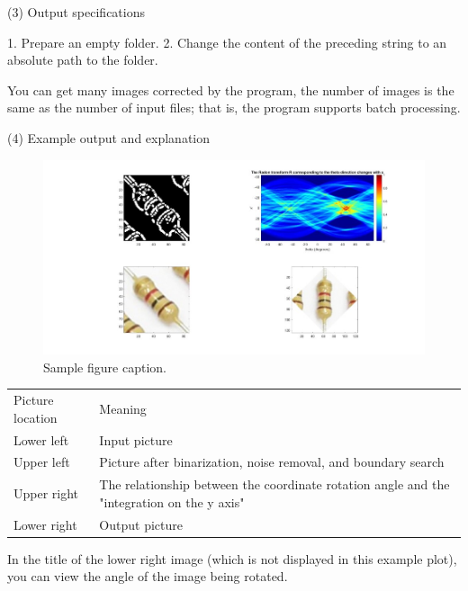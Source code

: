 \documentclass{article}
\begin{document}
(3) Output specifications


1. Prepare an empty folder.
2. Change the content of the preceding string to an absolute path to the folder.

You can get many images corrected by the program, the number of images is the same as the number of input files; that is, the program supports batch processing.

(4) Example output and explanation

\begin{figure}
	\centering
	\includegraphics[width=0.7\linewidth]{DmQ3syQ.jpg}
	\caption{Sample figure caption.}
	\label{fig:DmQ3syQjpg}
\end{figure}

\begin{table}[]
	\begin{tabular}{ll}
		Picture location & Meaning                                                                                    \\
		Lower left       & Input picture                                                                              \\
		Upper left       & Picture after binarization, noise removal, and boundary search                             \\
		Upper right      & The relationship between the coordinate rotation angle and the "integration on the y axis" \\
		Lower right      & Output picture                                                                            
	\end{tabular}
\end{table}

In the title of the lower right image (which is not displayed in this example plot), you can view the angle of the image being rotated.

\end{document}
